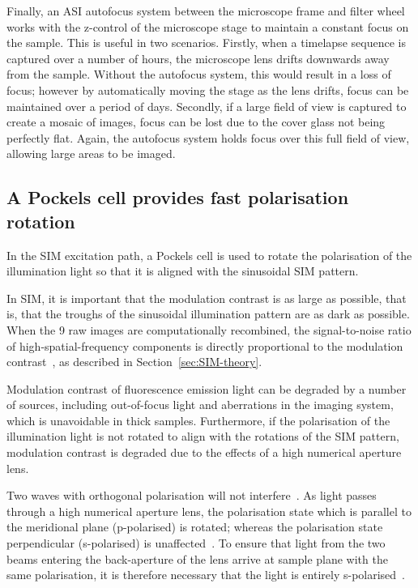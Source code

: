 Finally, an ASI autofocus system between the microscope frame and filter wheel works with the z-control of the microscope stage to maintain a constant focus on the sample.
This is useful in two scenarios.
Firstly, when a timelapse sequence is captured over a number of hours, the microscope lens drifts downwards away from the sample.
Without the autofocus system, this would result in a loss of focus; however by automatically moving the stage as the lens drifts, focus can be maintained over a period of days.
Secondly, if a large field of view is captured to create a mosaic of images, focus can be lost due to the cover glass not being perfectly flat.
Again, the autofocus system holds focus over this full field of view, allowing large areas to be imaged.


\subsection{A Pockels cell provides fast polarisation rotation} \label{sec:lagsim-pockels}
In the SIM excitation path, a Pockels cell is used to rotate the polarisation of the illumination light so that it is aligned with the sinusoidal SIM pattern.

In SIM, it is important that the modulation contrast is as large as possible, that is, that the troughs of the sinusoidal illumination pattern are as dark as possible.
When the 9 raw images are computationally recombined, the signal-to-noise ratio of high-spatial-frequency components is directly proportional to the modulation contrast~\cite{oholleran2012polarization}, as described in Section~\ref{sec:SIM-theory}.

Modulation contrast of fluorescence emission light can be degraded by a number of sources, including out-of-focus light and aberrations in the imaging system, which is unavoidable in thick samples.
Furthermore, if the polarisation of the illumination light is not rotated to align with the rotations of the SIM pattern,  modulation contrast is degraded due to the effects of a high numerical aperture lens.

Two waves with orthogonal polarisation will not interfere~\cite{nityananda2013interference}.
As light passes through a high numerical aperture lens, the polarisation state which is parallel to the meridional plane (p-polarised) is rotated; whereas the polarisation state perpendicular (s-polarised) is unaffected~\cite{mansuripur1991effects}.
To ensure that light from the two beams entering the back-aperture of the lens arrive at sample plane with the same polarisation, it is therefore necessary that the light is entirely s-polarised~\cite{oholleran2012polarization}.

